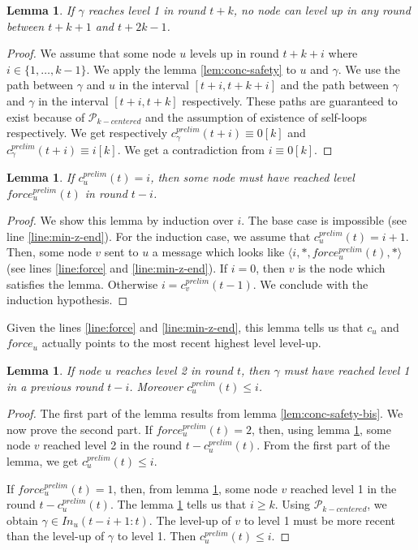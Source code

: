\documentclass[11pt,letterpaper]{article}
\newtheorem{lem}[thm]{Lemma}
\newcommand{\cent}{\gamma}
\begin{document}
\begin{lem} \label{lem:no-close-level2}
	If $\cent$ reaches level 1 in round $t+k$, no node can level up in any round between $t+k+1$ and $t+2k-1$.
\end{lem}
\begin{proof}
	We assume that some node $u$ levels up in round $t+k+i$ where $i \in \{1, \dots, k-1\}$.
	We apply the lemma \ref{lem:conc-safety} to $u$ and $\cent$.
	We use the path between $\cent$ and $u$ in the interval $[t+i,t+k+i]$ and the path between $\cent$ and $\cent$ in the interval $[t+i,t+k]$ respectively.
	These paths are guaranteed to exist because of $\mathcal{P}_{k-centered}$ and the assumption of existence of self-loops respectively.
	We get respectively $c_\cent^{prelim}(t+i) \equiv 0 [k]$ and $c_\cent^{prelim}(t+i) \equiv i [k]$.
	We get a contradiction from $i \equiv 0 [k]$.
\end{proof}

\begin{lem} \label{lem:safety-force}
	If $c_u^{prelim}(t) = i$, then some node must have reached level $force_u^{prelim}(t)$ in round $t-i$.
\end{lem}
\begin{proof}
	We show this lemma by induction over $i$.
	The base case is impossible (see line \ref{line:min-z-end}).
	For the induction case, we assume that $c_u^{prelim}(t) = i+1$.
	Then, some node $v$ sent to $u$ a message which looks like $\langle i, *, force_u^{prelim}(t), * \rangle$ (see lines \ref{line:force} and \ref{line:min-z-end}).
	If $i = 0$, then $v$ is the node which satisfies the lemma.
	Otherwise $i = c_v^{prelim}(t-1)$.
	We conclude with the induction hypothesis.
\end{proof}

Given the lines \ref{line:force} and \ref{line:min-z-end}, this lemma tells us that $c_u$ and $force_u$ actually points to the most recent highest level level-up.

\begin{lem} \label{lem:ready-safety}
	If node $u$ reaches level 2 in round $t$, then $\cent$ must have reached level 1 in a previous round $t-i$.
	Moreover $c^{prelim}_u(t) \leq i$.
\end{lem}
\begin{proof}
	The first part of the lemma results from lemma \ref{lem:conc-safety-bis}. We now prove the second part.
	If $force_u^{prelim}(t) = 2$, then, using lemma \ref{lem:safety-force}, some node $v$ reached level 2 in the round $t-c_u^{prelim}(t)$.
	From the first part of the lemma, we get $c_u^{prelim}(t) \leq i$. 

	If $force_u^{prelim}(t) = 1$, then, from lemma \ref{lem:safety-force}, some node $v$ reached level 1 in the round $t-c_u^{prelim}(t)$.
	The lemma \ref{lem:no-close-level2} tells us that $i \geq k$.
	Using $\mathcal{P}_{k-centered}$, we obtain $\cent \in In_u(t-i+1:t)$.
	The level-up of $v$ to level 1 must be more recent than the level-up of $\cent$ to level 1.
	Then $c_u^{prelim}(t) \leq i$.
\end{proof}
\end{document}
